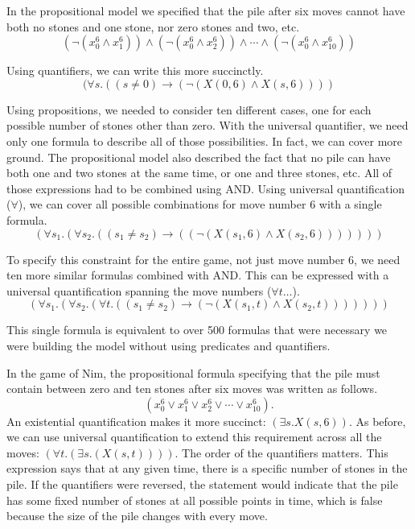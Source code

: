 {{In the propositional model we specified that the pile after six moves
cannot have both no stones and one stone, nor zero stones and two, etc.
$$(\neg(x_{0}^{6} \wedge x_{1}^{6})) \wedge (\neg(x_{0}^{6} \wedge x_{2}^{6})) \wedge \cdots \wedge (\neg(x_{0}^{6} \wedge x_{10}^{6}))$$

Using quantifiers, we can write this more succinctly.
$$(\forall s.((s \neq 0) \rightarrow (\neg(X(0, 6) \wedge X(s, 6))))$$

Using propositions, we needed to consider ten
different cases, one for each possible number of stones other than zero. With the
universal quantifier, we need only one formula to describe all of those
possibilities. In fact, we can cover more ground.
The propositional model also described the fact
that no pile can have both one and two stones at the same time, or one and three
stones, etc.  All of those expressions had to be combined using AND.
Using universal quantification ($\forall$),
we can cover all possible combinations
for move number 6 with a single formula.
$$(\forall s_1.(\forall s_2.((s_1 \ne s_2 ) \rightarrow ((\neg(X(s_1, 6) \wedge X(s_2, 6)))))))$$

To specify this constraint for the entire game, not just move number 6,
we need ten more similar formulas combined with AND.
This can be expressed with a universal quantification spanning the move numbers ($\forall t \dots$).
$$(\forall s_1.(\forall s_2.(\forall t.((s_1 \ne s_2) \rightarrow (\neg(X(s_1, t) \wedge X(s_2, t)))))))$$

This single formula is equivalent to over 500 formulas that were
necessary we were building the model without using predicates and quantifiers.

In the game of Nim, the propositional formula specifying that the pile must contain between zero and
ten stones after six moves was written as follows.
$$(x_{0}^{6} \vee x_{1}^{6} \vee x_{2}^{6} \vee \cdots \vee x_{10}^{6}).$$
An existential quantification makes it more succinct: $(\exists s.X(s, 6))$.
As before, we can use universal quantification to extend this requirement
across all the moves:
$(\forall t.(\exists s.(X(s, t))))$.
The order of the quantifiers matters. This expression says that at any given
time, there is a specific number of stones in the pile. If the quantifiers were reversed,
the statement would indicate that the pile has some fixed number of stones
at all possible points in time, which is false because the size of the pile
changes with every move.

}}
